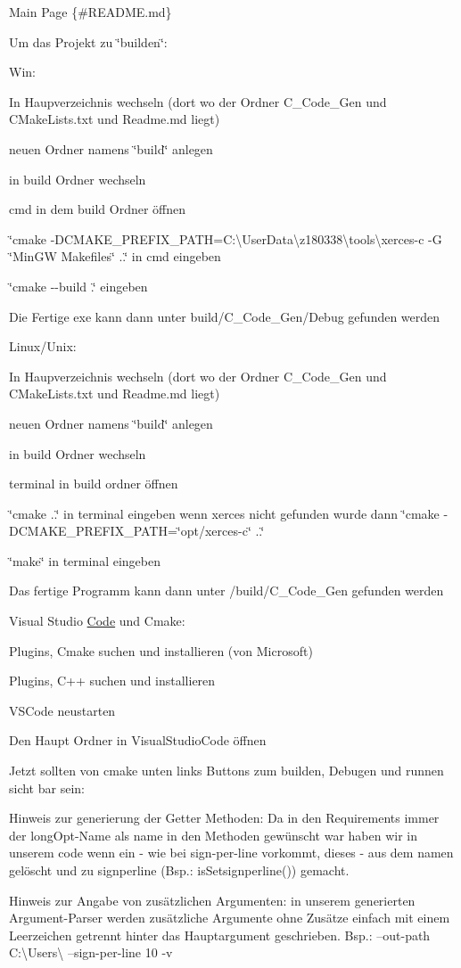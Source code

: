 Main Page \{\#\+README.\+md\}

Um das Projekt zu \char`\"{}builden\char`\"{}\+:

Win\+:

In Haupverzeichnis wechseln (dort wo der Ordner C\+\_\+\+Code\+\_\+\+Gen und CMake\+Lists.\+txt und Readme.\+md liegt)

neuen Ordner namens \char`\"{}build\char`\"{} anlegen

in build Ordner wechseln

cmd in dem build Ordner öffnen

\char`\"{}cmake -\/\+DCMAKE\+\_\+\+PREFIX\+\_\+\+PATH=\+C\+:\textbackslash{}\+User\+Data\textbackslash{}z180338\textbackslash{}tools\textbackslash{}xerces-\/c -\/\+G \char`\"{}Min\+GW Makefiles\char`\"{} ..\char`\"{} in cmd eingeben

\char`\"{}cmake -\/-\/build .\char`\"{} eingeben

Die Fertige exe kann dann unter build/\+C\+\_\+\+Code\+\_\+\+Gen/\+Debug gefunden werden

Linux/\+Unix\+:

In Haupverzeichnis wechseln (dort wo der Ordner C\+\_\+\+Code\+\_\+\+Gen und CMake\+Lists.\+txt und Readme.\+md liegt)

neuen Ordner namens \char`\"{}build\char`\"{} anlegen

in build Ordner wechseln

terminal in build ordner öffnen

\char`\"{}cmake ..\char`\"{} in terminal eingeben wenn xerces nicht gefunden wurde dann \char`\"{}cmake -\/\+DCMAKE\+\_\+\+PREFIX\+\_\+\+PATH=\char`\"{}opt/xerces-\/c\char`\"{} ..\char`\"{}

\char`\"{}make\char`\"{} in terminal eingeben

Das fertige Programm kann dann unter /build/\+C\+\_\+\+Code\+\_\+\+Gen gefunden werden

Visual Studio \mbox{\hyperlink{class_code}{Code}} und Cmake\+:

Plugins, Cmake suchen und installieren (von Microsoft)

Plugins, C++ suchen und installieren

VSCode neustarten

Den Haupt Ordner in Visual\+Studio\+Code öffnen

Jetzt sollten von cmake unten links Buttons zum builden, Debugen und runnen sicht bar sein\+:

Hinweis zur generierung der Getter Methoden\+: Da in den Requirements immer der long\+Opt-\/\+Name als name in den Methoden gewünscht war haben wir in unserem code wenn ein \textquotesingle{}-\/\textquotesingle{} wie bei sign-\/per-\/line vorkommt, dieses \textquotesingle{}-\/\textquotesingle{} aus dem namen gelöscht und zu signperline (Bsp.\+: is\+Setsignperline()) gemacht.

Hinweis zur Angabe von zusätzlichen Argumenten\+: in unserem generierten Argument-\/\+Parser werden zusätzliche Argumente ohne Zusätze einfach mit einem Leerzeichen getrennt hinter das Hauptargument geschrieben. Bsp.\+: --out-\/path C\+:\textbackslash{}\+Users\textbackslash{} --sign-\/per-\/line 10 -\/v 